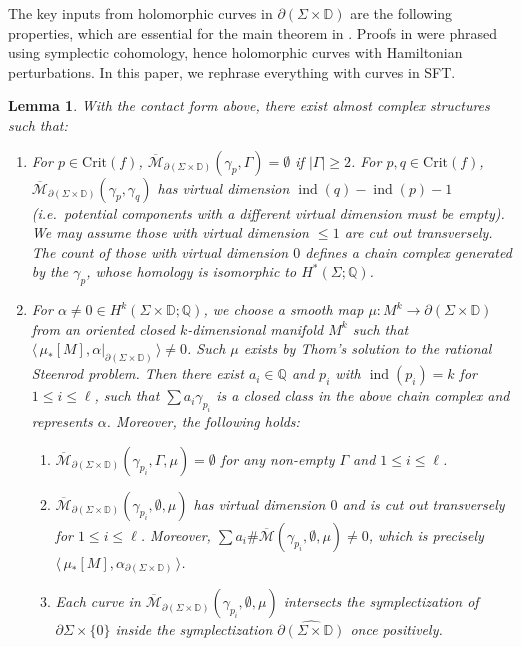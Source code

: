 \documentclass[11pt]{amsart}
\numberwithin{equation}{section}
\newtheorem{lemma}[theorem]{\textbf{Lemma}}
\def\D{{\mathbb D}}
\def\Q{{\mathbb Q}}
\def\cM{{\mathcal M}}
\def\la{\langle\,}
\def\ra{\,\rangle}
\DeclareMathOperator{\ind}{ind}
\begin{document}
The key inputs from holomorphic curves in $\partial(\Sigma \times \D)$ are the following properties, which are essential for the main theorem in \cite{zbMATH07673358}. Proofs in \cite{bowden2022tight,zbMATH07673358} were phrased using symplectic cohomology, hence holomorphic curves with Hamiltonian perturbations. In this paper, we rephrase everything with curves in SFT. 
\begin{lemma}\label{lemma:curve_on_product}
    With the contact form above, there exist almost complex structures such that: 
    \begin{enumerate}
        \item\label{curve1} For $p\in \mathrm{Crit}(f)$, $\overline{\cM}_{\partial(\Sigma \times \D)}(\gamma_p,\Gamma)=\emptyset$ if $|\Gamma|\ge 2$. For $p,q\in \mathrm{Crit}(f)$, $\overline{\cM}_{\partial(\Sigma \times \D)}(\gamma_p,\gamma_q)$ has virtual dimension $\ind(q)-\ind(p)-1$ (i.e.\ potential components with a different virtual dimension must be empty). We may assume those with virtual dimension $\le 1$ are cut out transversely. The count of those with virtual dimension $0$ defines a chain complex generated by the $\gamma_p$, whose homology is isomorphic to $H^*(\Sigma;\Q)$.
        \item\label{curve2} For $\alpha \ne 0\in H^k(\Sigma\times \D;\Q)$, we choose a smooth map $\mu:M^k\to \partial(\Sigma\times \D)$ from an oriented closed $k$-dimensional manifold $M^k$ such that $\la \mu_*[M],\alpha|_{\partial(\Sigma \times \D)}\ra\ne 0$. Such $\mu$ exists by Thom's solution to the rational Steenrod problem. Then there exist $a_i\in \Q$ and $p_i$ with $\ind(p_i)=k$ for $1\le i \le \ell$, such that $\sum a_i\gamma_{p_i}$ is a closed class in the above chain complex and represents $\alpha$. Moreover, the following holds:
        \begin{enumerate}
            \item\label{3a} $\overline{\cM}_{\partial(\Sigma \times \D)}(\gamma_{p_i},\Gamma,\mu)=\emptyset$ for any non-empty $\Gamma$ and $1\le i \le \ell$.
            \item\label{3b} $\overline{\cM}_{\partial(\Sigma \times \D)}(\gamma_{p_i},\emptyset,\mu)$ has virtual dimension $0$ and is cut out transversely for $1\le i \le \ell$.  Moreover, $\sum a_i\# \overline{\cM}(\gamma_{p_i},\emptyset,\mu)\ne 0$, which is precisely  $\la \mu_*[M],\alpha_{\partial(\Sigma \times \D)}\ra$.
            \item\label{3c} Each curve in $\overline{\cM}_{\partial(\Sigma \times \D)}(\gamma_{p_i},\emptyset,\mu)$ intersects the symplectization of $\partial \Sigma \times \{0\}$ inside the symplectization $\widehat{\partial (\Sigma \times \D)}$ once positively.
        \end{enumerate}
    \end{enumerate}
\end{lemma}
\end{document}
